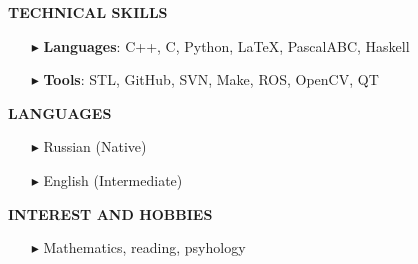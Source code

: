 \documentclass[a4paper,10pt]{article}
\begin{document}
	
	
	\colorbox{magicmint}{
		\begin{minipage}{0.96\textwidth}
			\textbf{TECHNICAL SKILLS}
		\end{minipage}
	}
	\begin{itemize}
		\item [$\blacktriangleright$]  \textbf{Languages}: C++, C, Python, \LaTeX, PascalABC, Haskell
		\item [$\blacktriangleright$]  \textbf{Tools}: STL, GitHub, SVN, Make, ROS, OpenCV, QT
	\end{itemize}
	 
	
	\colorbox{magicmint}{
		\begin{minipage}{0.96\textwidth}
			\textbf{LANGUAGES}
		\end{minipage}
	}
	\begin{itemize}
		\item[$\blacktriangleright$]  Russian (Native)
		\item[$\blacktriangleright$]  English (Intermediate)
	\end{itemize}
	
	
	\colorbox{magicmint}{
		\begin{minipage}{0.96\textwidth}
			\textbf{INTEREST AND HOBBIES}
		\end{minipage}
	}
	\begin{itemize}
		\item[$\blacktriangleright$]  Mathematics, reading, psyhology
	\end{itemize}
	
\end{document}
